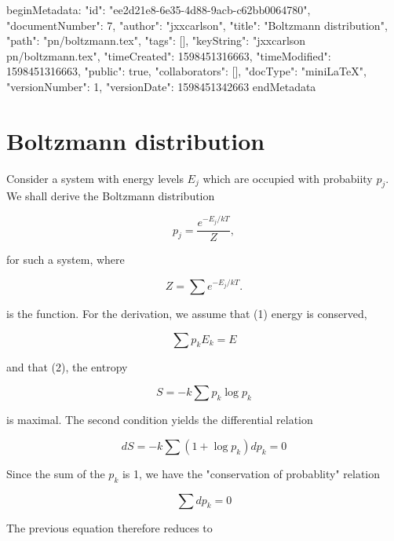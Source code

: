 beginMetadata:
{
    "id": "ee2d21e8-6e35-4d88-9acb-c62bb0064780",
    "documentNumber": 7,
    "author": "jxxcarlson",
    "title": "Boltzmann distribution",
    "path": "pn/boltzmann.tex",
    "tags": [],
    "keyString": "jxxcarlson pn/boltzmann.tex",
    "timeCreated": 1598451316663,
    "timeModified": 1598451316663,
    "public": true,
    "collaborators": [],
    "docType": "miniLaTeX",
    "versionNumber": 1,
    "versionDate": 1598451342663
}
endMetadata

\section{Boltzmann distribution}

Consider a system with energy levels $E_j$ which
are occupied with probabiity $p_j$. We shall
derive the Boltzmann distribution

\begin{equation}
p_j= \frac{e^{-E_j/kT}}{Z},
\end{equation}

for such a system, where

\begin{equation}
Z = \sum e^{-  E_j/kT}.
\end{equation}

is the  function.
For the derivation, we assume that (1) energy is conserved,

\begin{equation}
\label{eq:conservedEnergy}
 \sum p_kE_k = E
\end{equation}

and that (2), the entropy

\begin{equation}
S = - k \sum p_k \log p_k
\end{equation}

is maximal.  The second condition yields the differential relation

\begin{equation}
dS = - k \sum (1 +\log p_k)  dp_k = 0
\end{equation}


Since the sum of the $p_k$ is 1, we have the "conservation of probablity" relation

\begin{equation}
\label{eq:consprob}
\sum dp_k = 0
\end{equation}

The previous equation therefore reduces to

